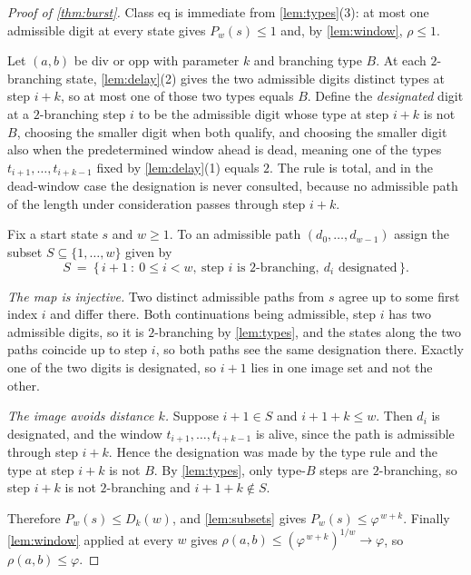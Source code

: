 \documentclass[11pt]{amsart}
\theoremstyle{definition}
\theoremstyle{remark}
\begin{document}
\begin{proof}[Proof of \cref{thm:burst}]
Class eq is immediate from \cref{lem:types}(3): at most one admissible digit at every state gives $P_w(s) \le 1$ and, by \cref{lem:window}, $\rho \le 1$.

Let $(a,b)$ be div or opp with parameter $k$ and branching type $B$. At each $2$-branching state, \cref{lem:delay}(2) gives the two admissible digits distinct types at step $i+k$, so at most one of those two types equals $B$. Define the \emph{designated} digit at a $2$-branching step $i$ to be the admissible digit whose type at step $i+k$ is not $B$, choosing the smaller digit when both qualify, and choosing the smaller digit also when the predetermined window ahead is dead, meaning one of the types $t_{i+1},\dots,t_{i+k-1}$ fixed by \cref{lem:delay}(1) equals $2$. The rule is total, and in the dead-window case the designation is never consulted, because no admissible path of the length under consideration passes through step $i+k$.

Fix a start state $s$ and $w \ge 1$. To an admissible path $(d_0,\dots,d_{w-1})$ assign the subset $S \subseteq \{1,\dots,w\}$ given by
\[
  S \ = \ \bigl\{\, i + 1 \ : \ 0 \le i < w, \ \text{step } i \text{ is } 2\text{-branching},
  \ d_i \text{ designated} \,\bigr\} .
\]

\emph{The map is injective.} Two distinct admissible paths from $s$ agree up to some first index $i$ and differ there. Both continuations being admissible, step $i$ has two admissible digits, so it is $2$-branching by \cref{lem:types}, and the states along the two paths coincide up to step $i$, so both paths see the same designation there. Exactly one of the two digits is designated, so $i+1$ lies in one image set and not the other.

\emph{The image avoids distance $k$.} Suppose $i+1 \in S$ and $i+1+k \le w$. Then $d_i$ is designated, and the window $t_{i+1},\dots,t_{i+k-1}$ is alive, since the path is admissible through step $i+k$. Hence the designation was made by the type rule and the type at step $i+k$ is not $B$. By \cref{lem:types}, only type-$B$ steps are $2$-branching, so step $i+k$ is not $2$-branching and $i+1+k \notin S$.

Therefore $P_w(s) \le D_k(w)$, and \cref{lem:subsets} gives $P_w(s) \le \varphi^{\,w+k}$. Finally \cref{lem:window} applied at every $w$ gives $\rho(a,b) \le (\varphi^{\,w+k})^{1/w} \to \varphi$, so $\rho(a,b) \le \varphi$.
\end{proof}
\end{document}
